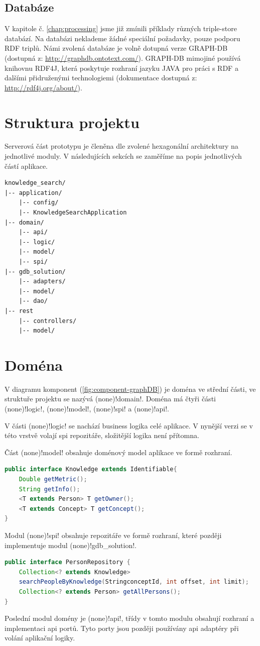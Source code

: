 \subsection{Databáze}
V kapitole č. \ref{chap:processing} jsme již zmínili příklady různých triple-store databází. Na databázi neklademe žádné speciální požadavky, pouze podporu RDF triplů. Námi zvolená databáze je volně dotupná verze GRAPH-DB (dostupná z: \url{http://graphdb.ontotext.com/}). GRAPH-DB mimojiné používá knihovnu RDF4J, která poskytuje rozhraní jazyku JAVA pro práci s RDF a dalšími přidruženými technologiemi (dokumentace dostupná z: \url{http://rdf4j.org/about/}).
\section{Struktura projektu}
Serverová část prototypu je členěna dle zvolené hexagonální architektury na jednotlivé moduly. V následujících sekcích se zaměříme na popis jednotlivých částí aplikace.
\begin{lstlisting}[caption= Schématicky zobrazená struktura projektu, captionpos=b]
knowledge_search/
|-- application/
    |-- config/
    |-- KnowledgeSearchApplication
|-- domain/
    |-- api/
    |-- logic/
    |-- model/
    |-- spi/
|-- gdb_solution/
    |-- adapters/
    |-- model/
    |-- dao/
|-- rest
    |-- controllers/
    |-- model/
\end{lstlisting} 

\section{Doména}
V diagramu komponent (\ref{fig:component-graphDB}) je doména ve střední části, ve struktuře projektu se nazývá \ctulst(none)!domain!. Doména má čtyři části \ctulst(none)!logic!, \ctulst(none)!model!, \ctulst(none)!spi! a \ctulst(none)!api!.\par
V části \ctulst(none)!logic! se nachází business logika celé aplikace. V nynější verzi se v této vrstvě volají spi repozitáře, složitější logika není přítomna.\par
\noindent Část \ctulst(none)!model! obsahuje doménový model aplikace ve formě rozhraní.
\begin{lstlisting}[language=JAVA, caption= Ukázka rozhraní jedné z entit v doménovém modelu, captionpos=b]
public interface Knowledge extends Identifiable{
    Double getMetric();
    String getInfo();
    <T extends Person> T getOwner();
    <T extends Concept> T getConcept();
}
\end{lstlisting}
Modul \ctulst(none)!spi! obsahuje repozitáře ve formě rozhraní, které později implementuje modul \ctulst(none)!gdb_solution!.
\begin{lstlisting}[language=JAVA, caption= Ukázka rozhraní SPI repozitáře, captionpos=b]
public interface PersonRepository {
    Collection<? extends Knowledge>
    searchPeopleByKnowledge(StringconceptId, int offset, int limit);
    Collection<? extends Person> getAllPersons();
}
\end{lstlisting}
Poslední modul domény je \ctulst(none)!api!, třídy v tomto modulu obsahují rozhraní a implementaci api portů. Tyto porty jsou později používány api adaptéry při volání aplikační logiky.
